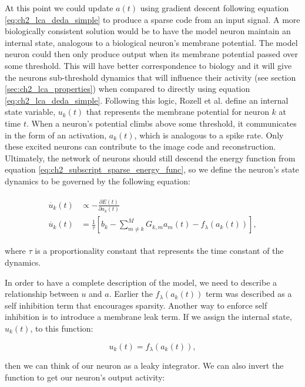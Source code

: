 At this point we could update $a(t)$ using gradient descent following equation \eqref{eq:ch2_lca_deda_simple} to produce a sparse code from an input signal. A more biologically consistent solution would be to have the model neuron maintain an internal state, analogous to a biological neuron's membrane potential. The model neuron could then only produce output when its membrane potential passed over some threshold. This will have better correspondence to biology and it will give the neurons sub-threshold dynamics that will influence their activity (see section \ref{sec:ch2_lca_properties}) when compared to directly using equation \ref{eq:ch2_lca_deda_simple}. Following this logic, Rozell et al. \citeyearpar{rozell2008sparse} define an internal state variable, $u_{k}(t)$ that represents the membrane potential for neuron $k$ at time $t$. When a neuron's potential climbs above some threshold, it communicates in the form of an activation, $a_{k}(t)$, which is analogous to a spike rate. Only these excited neurons can contribute to the image code and reconstruction. Ultimately, the network of neurons should still descend the energy function from equation \eqref{eq:ch2_subscript_sparse_energy_func}, so we define the neuron's state dynamics to be governed by the following equation:

\begin{align}\label{eq:ch2_u_dot}
\begin{split}
    \dot{u_{k}}(t) &\propto - \frac{\partial E(t)} {\partial a_{k}(t)} \\
    \dot{u_{k}}(t) &= \frac{1}{\tau} \left[b_{k} - \sum_{m \neq k}^{M}G_{k,m}a_{m}(t) - f_{\lambda}(a_{k}(t)) \right],
\end{split}
\end{align}

\noindent where $\tau$ is a proportionality constant that represents the time constant of the dynamics.

In order to have a complete description of the model, we need to describe a relationship between $u$ and $a$. Earlier the $f_{\lambda}(a_{k}(t))$ term was described as a self inhibition term that encourages sparsity. Another way to enforce self inhibition is to introduce a membrane leak term. If we assign the internal state, $u_{k}(t)$, to this function:

\begin{equation}\label{eq:ch2_u_func_a}
    u_k(t) = f_{\lambda}(a_{k}(t)),
\end{equation}

\noindent then we can think of our neuron as a leaky integrator. We can also invert the function to get our neuron's output activity:

